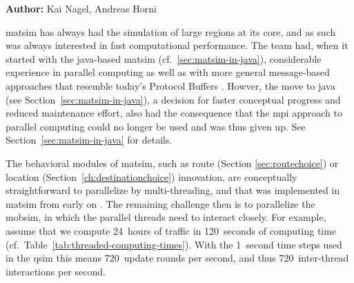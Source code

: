 \hfill \textbf{Author:} Kai Nagel, Andreas Horni


\gls{matsim} has always had the simulation of large regions at its core, and as such was always interested in fast computational performance.  The team had, when it started with the \gls{java}-based \gls{matsim} (cf.~\ref{sec:matsim-in-java}), considerable experience in parallel computing \citep{NagelSchleicher1994Microscopictrafficmodeling,RickertNagel1999hpcn99,NagelRickert2001parallel,CetinBurriNagel2003queue} as well as with more general message-based approaches \citep{GloorNagel2005ped-att04-birkh} that resemble today's Protocol Buffers \citep{ProtocolBuffersWww}.
%
Howver, the move to \gls{java} (see Section~\ref{sec:matsim-in-java}), a decision for faster conceptual progress and reduced maintenance effort, also had the consequence that the \gls{mpi} approach to parallel computing could no longer be used and was thus given up.  See Section~\ref{sec:matsim-in-java} for details.



The behavioral modules of \gls{matsim}, such as route (Section \ref{sec:routechoice}) or location (Section~\ref{ch:destinationchoice}) innovation, are conceptually straightforward to parallelize by multi-threading, and that was implemented in \gls{matsim} from early on \citep[][see Section~\ref{sec:using-parallel-computing} how to use this]{BalmerEtc2008matsim-arch-perf-MAS-TT}.  The remaining challenge then is to parallelize the \gls{mobsim}, in which the parallel threads need to interact closely.  For example, assume that we compute 24~hours of traffic in 120~seconds of computing time (cf.~Table~\ref{tab:threaded-computing-times}).  With the 1~second time steps used in the \gls{qsim} this means 720~update rounds per second, and thus 720~inter-thread interactions per second.

